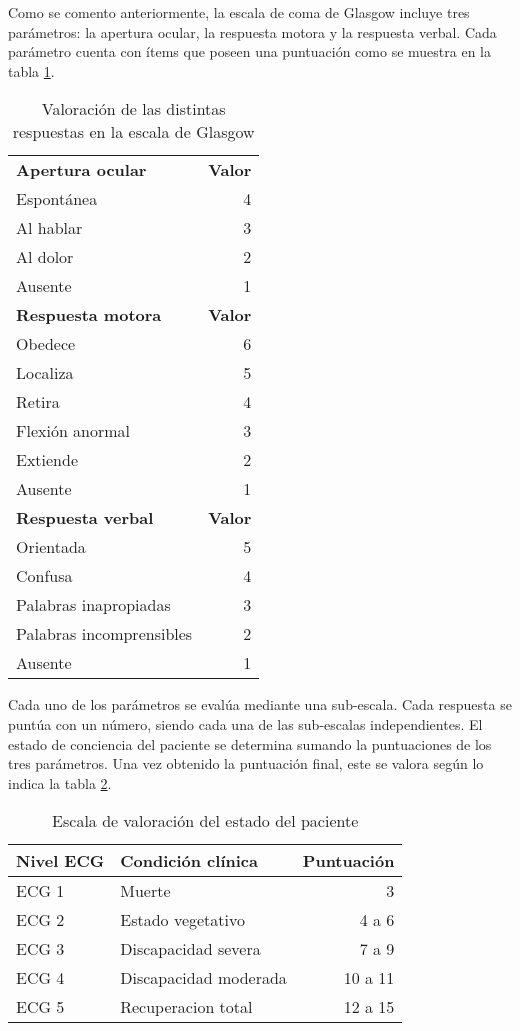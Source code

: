 Como se comento anteriormente, la escala de coma de Glasgow incluye tres parámetros: la apertura ocular, la respuesta motora y la respuesta verbal. Cada parámetro cuenta con ítems que poseen una puntuación como se muestra en la tabla
\ref{tab:seleccion_glasgow_respuestas}. 

\begin{table}[!hbt]
\centering
\begin{tabular}{lr}
\textbf{Apertura ocular} & \textbf{Valor} \\
Espontánea & 4 \\
Al hablar & 3 \\
Al dolor & 2 \\
Ausente & 1 \\
\textbf{Respuesta motora} & \textbf{Valor} \\
Obedece & 6 \\
Localiza & 5 \\
Retira & 4 \\
Flexión anormal & 3 \\
Extiende & 2 \\
Ausente & 1 \\
\textbf{Respuesta verbal} & \textbf{Valor} \\
Orientada & 5 \\
Confusa & 4 \\
Palabras inapropiadas & 3 \\
Palabras incomprensibles & 2 \\
Ausente & 1 \\
\end{tabular}
\caption{Valoración de las distintas respuestas en la escala de Glasgow}
\label{tab:seleccion_glasgow_respuestas}
\end{table}

Cada uno de los parámetros se evalúa mediante una sub-escala. Cada respuesta se puntúa con un número, siendo cada
una de las sub-escalas independientes. El estado de conciencia del paciente se determina sumando la puntuaciones
de los tres parámetros. Una vez obtenido la puntuación final, este se valora según lo indica la tabla \ref{tab:seleccion_glasgow_estado}.

\begin{table}[!hbt]
\centering
\begin{tabular}{llr}
\toprule
\textbf{Nivel ECG} & 
\textbf{Condición clínica} & 
\textbf{Puntuación} \\ 
\midrule
 ECG 1 & Muerte & 3 \\
 ECG 2 & Estado vegetativo & 4 a 6 \\
 ECG 3 & Discapacidad severa & 7 a 9 \\
 ECG 4 & Discapacidad moderada & 10 a 11 \\
 ECG 5 & Recuperacion total & 12 a 15 \\
\bottomrule
\end{tabular}
\caption{Escala de valoración del estado del paciente}
\label{tab:seleccion_glasgow_estado}
\end{table}

